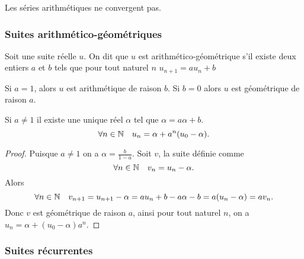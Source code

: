 Les séries arithmétiques ne convergent pas.

\subsubsection{Suites arithmético-géométriques}

\begin{defdef}
  Soit une suite réelle \(u\). On dit que \(u\) est arithmético-géométrique s'il existe deux entiers \(a\) et \(b\) tels que pour tout naturel \(n\) \(u_{n+1}=au_n +b\)
\end{defdef}

Si \(a=1\), alors \(u\) est arithmétique de raison \(b\). Si \(b=0\) alors \(u\) est géométrique de raison \(a\).

\begin{prop}
  Si \(a\neq 1\) il existe une unique réel \(\alpha\) tel que \(\alpha=a\alpha+b\). %
  \begin{equation}
    \forall n \in \mathbb{N} \quad u_n=\alpha + a^{n}(u_0-\alpha).
  \end{equation}
\end{prop}
\begin{proof}
  Puisque \(a \neq 1\) on a \(\alpha = \frac{b}{1-a}\). Soit \(v\), la suite définie comme
  \begin{equation}
    \forall n \in \mathbb{N} \quad v_n = u_n -\alpha.
  \end{equation}
Alors
\begin{equation}
  \forall n \in \mathbb{N} \quad v_{n+1}=u_{n+1}-\alpha = a u_n +b - a\alpha -b = a(u_n-\alpha)=a v_n.
\end{equation}
Donc \(v\) est géométrique de raison \(a\), ainsi pour tout naturel \(n\), on a \(u_n=\alpha + (u_0-\alpha)a^n\).
\end{proof}

\subsubsection{Suites récurrentes}

